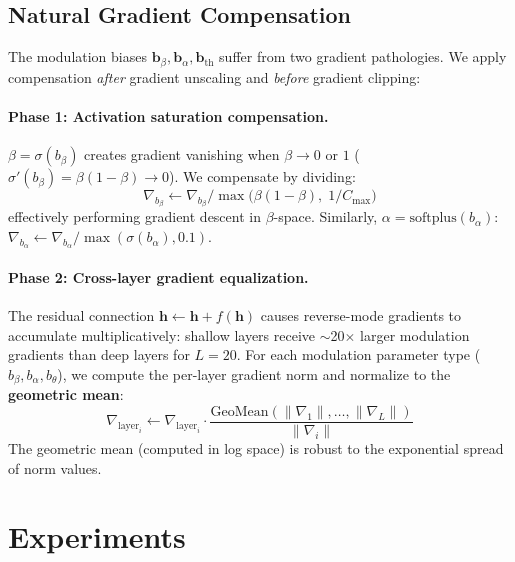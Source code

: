 \documentclass[10pt,twocolumn]{article}
\begin{document}
\subsection{Natural Gradient Compensation}
\label{sec:natural-gradient}

The modulation biases $\mathbf{b}_\beta, \mathbf{b}_\alpha, \mathbf{b}_{\text{th}}$ suffer from two gradient pathologies.
We apply compensation \emph{after} gradient unscaling and \emph{before} gradient clipping:

\paragraph{Phase 1: Activation saturation compensation.}
$\beta = \sigma(b_\beta)$ creates gradient vanishing when $\beta \to 0$ or $1$ ($\sigma'(b_\beta) = \beta(1-\beta) \to 0$).
We compensate by dividing:
\begin{equation}
    \nabla_{b_\beta} \leftarrow \nabla_{b_\beta} \big/ \max\big(\beta(1-\beta),\; 1/C_{\max}\big)
\end{equation}
effectively performing gradient descent in $\beta$-space.
Similarly, $\alpha = \text{softplus}(b_\alpha)$: $\nabla_{b_\alpha} \leftarrow \nabla_{b_\alpha} / \max(\sigma(b_\alpha), 0.1)$.

\paragraph{Phase 2: Cross-layer gradient equalization.}
The residual connection $\mathbf{h} \leftarrow \mathbf{h} + f(\mathbf{h})$ causes reverse-mode gradients to accumulate multiplicatively: shallow layers receive $\sim$20$\times$ larger modulation gradients than deep layers for $L=20$.
For each modulation parameter type ($b_\beta, b_\alpha, b_\theta$), we compute the per-layer gradient norm and normalize to the \textbf{geometric mean}:
\begin{equation}
    \nabla_{\text{layer}_i} \leftarrow \nabla_{\text{layer}_i} \cdot \frac{\text{GeoMean}(\|\nabla_1\|, \ldots, \|\nabla_L\|)}{\|\nabla_i\|}
\end{equation}
The geometric mean (computed in log space) is robust to the exponential spread of norm values.


\section{Experiments}
\label{sec:experiments}
\end{document}
